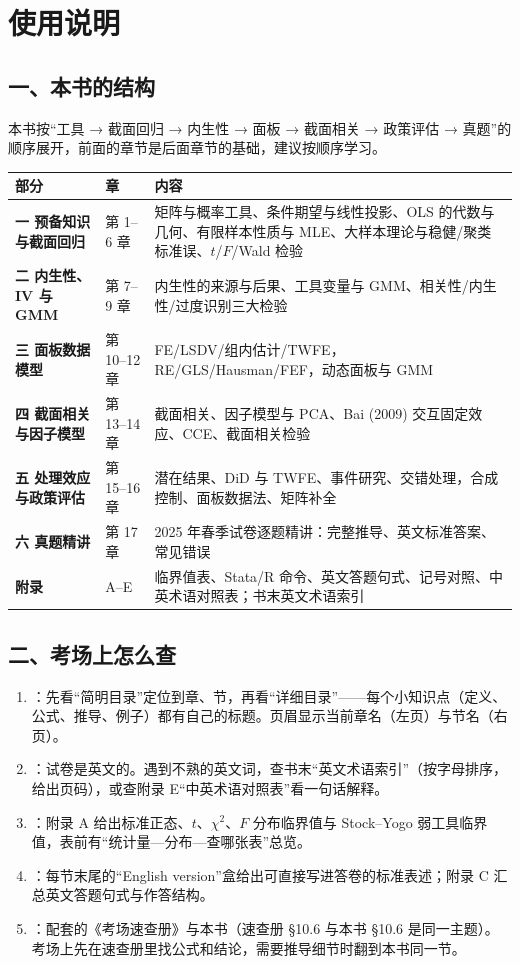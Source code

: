\chapter*{使用说明}

\section*{一、本书的结构}
本书按“工具 → 截面回归 → 内生性 → 面板 → 截面相关 → 政策评估 → 真题”的顺序展开，前面的章节是后面章节的基础，建议按顺序学习。

\begin{center}
\begin{tabularx}{\linewidth}{>{\bfseries}p{3.4cm}p{1.9cm}L}
\toprule
部分 & 章 & 内容 \\
\midrule
一 预备知识与截面回归 & 第 1–6 章 & 矩阵与概率工具、条件期望与线性投影、OLS 的代数与几何、有限样本性质与 MLE、大样本理论与稳健/聚类标准误、$t$/$F$/Wald 检验 \\
二 内生性、IV 与 GMM & 第 7–9 章 & 内生性的来源与后果、工具变量与 GMM、相关性/内生性/过度识别三大检验 \\
三 面板数据模型 & 第 10–12 章 & FE/LSDV/组内估计/TWFE，RE/GLS/Hausman/FEF，动态面板与 GMM \\
四 截面相关与因子模型 & 第 13–14 章 & 截面相关、因子模型与 PCA、Bai (2009) 交互固定效应、CCE、截面相关检验 \\
五 处理效应与政策评估 & 第 15–16 章 & 潜在结果、DiD 与 TWFE、事件研究、交错处理，合成控制、面板数据法、矩阵补全 \\
六 真题精讲 & 第 17 章 & 2025 年春季试卷逐题精讲：完整推导、英文标准答案、常见错误 \\
附录 & A–E & 临界值表、Stata/R 命令、英文答题句式、记号对照、中英术语对照表；书末英文术语索引 \\
\bottomrule
\end{tabularx}
\end{center}

\section*{二、考场上怎么查}
\begin{enumerate}
\item {}：先看“简明目录”定位到章、节，再看“详细目录”——每个小知识点（定义、公式、推导、例子）都有自己的标题。页眉显示当前章名（左页）与节名（右页）。
\item {}：试卷是英文的。遇到不熟的英文词，查书末“英文术语索引”（按字母排序，给出页码），或查附录 E“中英术语对照表”看一句话解释。
\item {}：附录 A 给出标准正态、$t$、$\chi^2$、$F$ 分布临界值与 Stock--Yogo 弱工具临界值，表前有“统计量—分布—查哪张表”总览。
\item {}：每节末尾的“English version”盒给出可直接写进答卷的标准表述；附录 C 汇总英文答题句式与作答结构。
\item {}：配套的《考场速查册》与本书（速查册 §10.6 与本书 §10.6 是同一主题）。考场上先在速查册里找公式和结论，需要推导细节时翻到本书同一节。
\end{enumerate}


